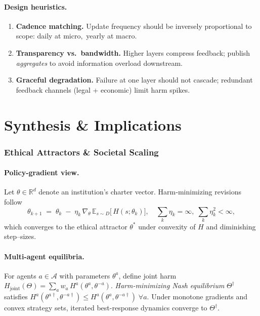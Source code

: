 \paragraph{Design heuristics.}
\begin{enumerate}
\item \textbf{Cadence matching.}
      Update frequency should be inversely proportional to scope:
      daily at micro,\ yearly at macro.
\item \textbf{Transparency vs.\ bandwidth.}
      Higher layers compress feedback; publish \emph{aggregates}
      to avoid information overload downstream.
\item \textbf{Graceful degradation.}
      Failure at one layer should not cascade;
      redundant feedback channels (legal + economic) limit harm spikes.
\end{enumerate}

\section*{Synthesis \& Implications}


\subsubsection{Ethical Attractors \& Societal Scaling}
\label{sec:attractors-scaling}

\paragraph{Policy-gradient view.}
Let $\theta \in \mathbb{R}^d$ denote an institution’s charter vector.
Harm‐minimizing revisions follow
\begin{equation}
  \theta_{k+1} \;=\; \theta_k \;-\; \eta_k \,
  \nabla_{\theta}\,\mathbb{E}_{s\sim D}\!\bigl[\,H(s;\theta_k)\bigr],
  \quad
  \sum_k \eta_k = \infty,\;
  \sum_k \eta_k^2 < \infty,
\label{eq:policy-grad}
\end{equation}
which converges to the ethical attractor $\theta^\ast$
under convexity of $H$ and diminishing step–sizes.

\paragraph{Multi-agent equilibria.}
For agents $a\in\mathcal{A}$ with parameters $\theta^a$,
define joint harm
$
  H_{\text{joint}}(\Theta)
  = \sum_{a} w_a\,H^a(\theta^a,\theta^{-a}).
$
\emph{Harm-minimizing Nash equilibrium}
$\Theta^\dagger$ satisfies
$
  H^a(\theta^{a\dagger},\theta^{-a\dagger})
  \le
  H^a(\theta^{a},\theta^{-a\dagger})
  \;\forall a.
$
Under monotone gradients and convex strategy sets,
iterated best-response dynamics converge to $\Theta^\dagger$.

